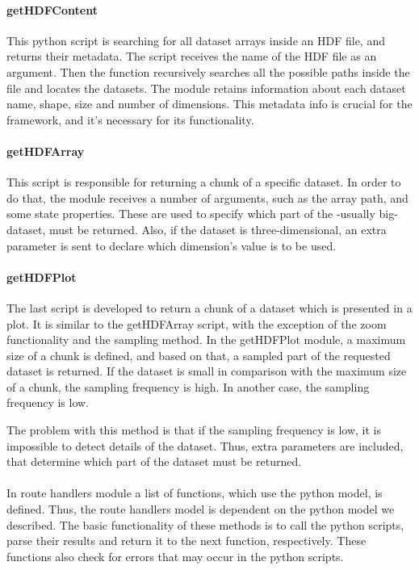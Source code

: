 \paragraph{getHDFContent}
This python script is searching for all dataset arrays inside an HDF file, and returns their metadata. The script receives the name of the HDF file as an argument. Then the function recursively searches all the possible paths inside the file and locates the datasets. The module retains information about each dataset name, shape, size and number of dimensions. This metadata info is crucial for the framework, and it's necessary for its functionality.

\paragraph{getHDFArray}
This script is responsible for returning a chunk of a specific dataset. In order to do that, the module receives a number of arguments, such as the array path, and some state properties. These are used to specify which part of the -usually big- dataset, must be returned. Also, if the dataset is three-dimensional, an extra parameter is sent to declare which dimension's value is to be used.

\paragraph{getHDFPlot}
The last script is developed to return a chunk of a dataset which is presented in a plot. It is similar to the getHDFArray script, with the exception of the zoom functionality and the sampling method. In the getHDFPlot module, a maximum size of a chunk is defined, and based on that, a sampled part of the requested dataset is returned. If the dataset is small in comparison with the maximum size of a chunk, the sampling frequency is high. In another case, the sampling frequency is low. \par 
	The problem with this method is that if the sampling frequency is low, it is impossible to detect details of the dataset. Thus, extra parameters are included, that determine which  part of the dataset must be returned.
	
\paragraph{}
In route handlers module a list of functions, which use the python model, is defined. Thus, the route handlers model is dependent on the python model we described. The basic functionality of these methods is to call the python scripts, parse their results and return it to the next function, respectively. These functions also check for errors that may occur in the python scripts. 


